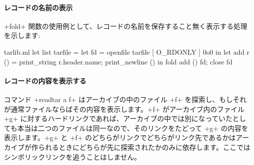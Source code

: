 \paragraph{レコードの名前の表示}
\ml+fold+ 関数の使用例として、レコードの名前を保存すること無く表示する処理を示します:
\begin{listingcodefile}{tarlib.ml}
let list tarfile =
  let fd = openfile tarfile [ O_RDONLY ] 0o0 in
  let add r () = print_string r.header.name; print_newline () in
  fold add () fd;
  close fd
\end{listingcodefile}

\paragraph{レコードの内容を表示する}
コマンド \ml+readtar a f+ はアーカイブの中のファイル \ml+f+ を探索し、もしそれが通常ファイルならばその内容を表示します。\ml+f+ がアーカイブ内のファイル \ml+g+ に対するハードリンクであれば、アーカイブの中では別になっていたとしても本当は二つのファイルは同一なので、そのリンクをたどって \ml+g+ の内容を表示します。\ml+g+ と \ml+f+ のどちらがリンクでどちらがリンク先であるかはアーカイブが作られるときにどちらが先に探索されたかのみに依存します。ここではシンボリックリンクを追うことはしません。


